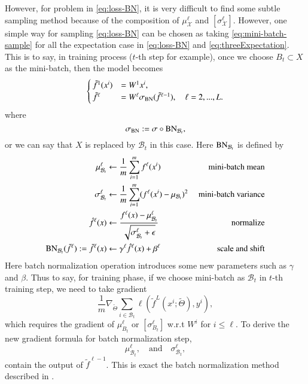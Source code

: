 However, for problem in \eqref{eq:loss-BN}, it is very difficult to find some 
subtle sampling method because of the composition of $\mu^\ell_{\mathcal X}$
and $[\sigma^\ell_{\mathcal X}]$. However, one simple way for sampling 
\eqref{eq:loss-BN} can be chosen as taking \eqref{eq:mini-batch-sample} for
all the expectation case in \eqref{eq:loss-BN} and \eqref{eq:threeExpectation}. 
This is to say, in training process ($t$-th step for example), once we choose $B_t \subset X$
as the mini-batch, then the model becomes
\begin{equation}\label{nn-BN-training}
\begin{cases}
\tilde f^1(x^i)&= W^1 x^i ,\\
\tilde f^\ell &= W^{\ell}  \sigma_{\rm BN}(\tilde f^{\ell-1}), \quad  \ell=2,...,L.
\end{cases}
\end{equation}
where
\begin{equation}
\sigma_{\rm BN} := \sigma \circ {\rm BN}_{\mathcal B_t},
\end{equation}
or we can say that $X$ is replaced by $\mathcal B_t$ in this case. 
Here ${\rm BN}_{\mathcal B_t}$ is defined by
\begin{equation}\label{def:BNeq-traning}
\begin{aligned}
\mu^\ell_{\mathcal B_t} & \leftarrow \frac{1}{m}\sum_{i=1}^m f^\ell(x^i) & \text{ mini-batch mean}& \\
\sigma^\ell_{\mathcal B_t} & \leftarrow \frac{1}{m}\sum_{i=1}^m (f^\ell(x^i)-\mu_{\mathcal B_t})^2 &  \text{ mini-batch variance}&\\
\hat f^\ell (x) & \leftarrow \frac{f^\ell(x)-\mu^\ell_{\mathcal B_t}}{\sqrt{\sigma^\ell_{\mathcal B_t}+\epsilon}}   &\text{ normalize}&\\
{\rm BN}_{\mathcal B_t}(\tilde f^{\ell}) := \tilde f^\ell(x) & \leftarrow \gamma^\ell \hat f^\ell (x) + \beta^\ell 
&\text{ scale and shift}&
\end{aligned}
\end{equation}
Here batch normalization operation introduces some new parameters such as $\gamma$ and $\beta$. 
Thus to say, for training phase, if we choose mini-batch as $\mathcal B_t$ in $t$-th training
step, we need to take gradient  
\begin{equation}
\frac{1}{m}\nabla_{\tilde \Theta} \sum_{i \in \mathcal B_t} \ell(\tilde f^L(x^i; \tilde \Theta), y^i),
\end{equation}
which requires the gradient of $\mu_{B_t}^\ell$ or $[\sigma_{B_t}^\ell]$
w.r.t $W^i$ for $i \le \ell$.
To derive the new gradient formula for batch normalization step,
$$
\mu^\ell_{\mathcal B_t}, \quad \text{and} \quad \sigma^\ell_{\mathcal B_t},
$$
contain the output of $\tilde f^{\ell-1}$.  
This is exact the batch normalization method described in \cite{ioffe2015batch}.


